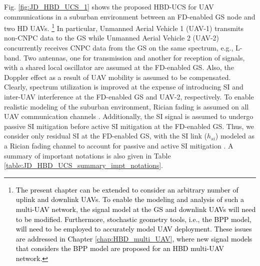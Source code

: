 Fig. \ref{fig:JD_HBD_UCS_1} shows the proposed HBD-UCS for UAV communications in a suburban environment between an FD-enabled GS node and two HD UAVs. \textcolor{black}{\footnote{\textcolor{black}{The present chapter can be extended to consider an arbitrary number of uplink and downlink UAVs. To enable the modeling and analysis of such a multi-UAV network, the signal model at the GS and downlink UAVs will need to be modified. Furthermore, stochastic geometry tools, i.e., the BPP model, will need to be employed to accurately model UAV deployment. These issues are addressed in Chapter \ref{chap:HBD_multi_UAV}, where new signal models that considers the BPP model are proposed for an HBD multi-UAV network.}}} In particular, Unmanned Aerial Vehicle 1 (UAV-1) transmits non-CNPC data to the GS while Unmanned Aerial Vehicle 2 (UAV-2) concurrently receives CNPC data from the GS on the same spectrum, e.g., L-band. Two antennas, one for transmission and another for reception of signals, with a shared local oscillator are assumed at the FD-enabled GS. Also, the Doppler effect as a result of UAV mobility is assumed to be compensated. Clearly, spectrum utilization is improved at the expense of introducing SI and inter-UAV interference at the FD-enabled GS and UAV-2, respectively. To enable realistic modeling of the suburban environment, Rician fading is assumed on all UAV communication channels \cite{matolak2017air_suburban}. Additionally, the SI signal is assumed to undergo passive SI mitigation before active SI mitigation at the FD-enabled GS. Thus, we consider only residual SI at the FD-enabled GS, with the SI link ($h_{si}$) modeled as a Rician fading channel to account for passive and active SI mitigation \cite{ahmed2015all}. A summary of important notations is also given in Table \ref{table:JD_HBD_UCS_summary_impt_notations}.

